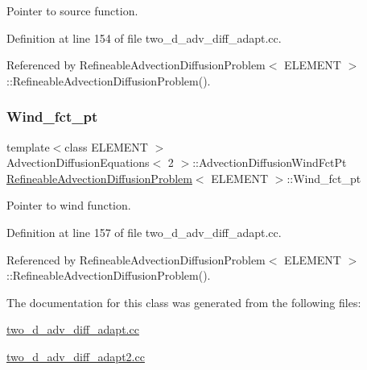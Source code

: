 Pointer to source function. 



Definition at line 154 of file two\+\_\+d\+\_\+adv\+\_\+diff\+\_\+adapt.\+cc.



Referenced by Refineable\+Advection\+Diffusion\+Problem$<$ E\+L\+E\+M\+E\+N\+T $>$\+::\+Refineable\+Advection\+Diffusion\+Problem().

\mbox{\label{classRefineableAdvectionDiffusionProblem_ab52483c93bacbb9521aaaf52680be996}} 
\subsubsection{\texorpdfstring{Wind\+\_\+fct\+\_\+pt}{Wind\_fct\_pt}}
{\footnotesize\ttfamily template$<$class E\+L\+E\+M\+E\+NT $>$ \\
Advection\+Diffusion\+Equations$<$ 2 $>$\+::Advection\+Diffusion\+Wind\+Fct\+Pt \hyperlink{classRefineableAdvectionDiffusionProblem}{Refineable\+Advection\+Diffusion\+Problem}$<$ E\+L\+E\+M\+E\+NT $>$\+::Wind\+\_\+fct\+\_\+pt\hspace{0.3cm}{\ttfamily [private]}}



Pointer to wind function. 



Definition at line 157 of file two\+\_\+d\+\_\+adv\+\_\+diff\+\_\+adapt.\+cc.



Referenced by Refineable\+Advection\+Diffusion\+Problem$<$ E\+L\+E\+M\+E\+N\+T $>$\+::\+Refineable\+Advection\+Diffusion\+Problem().



The documentation for this class was generated from the following files\+:\begin{DoxyCompactItemize}
\item 
\hyperlink{two__d__adv__diff__adapt_8cc}{two\+\_\+d\+\_\+adv\+\_\+diff\+\_\+adapt.\+cc}\item 
\hyperlink{two__d__adv__diff__adapt2_8cc}{two\+\_\+d\+\_\+adv\+\_\+diff\+\_\+adapt2.\+cc}\end{DoxyCompactItemize}
